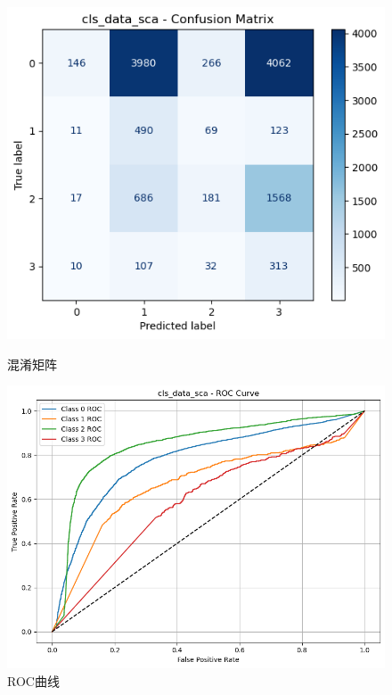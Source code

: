 \documentclass[10pt]{article}
\begin{document}
\begin{figure}[H]
\centering
\begin{minipage}[t]{0.45\textwidth}
  \centering
  \includegraphics[width=\linewidth]{cls_nb_sca1.png}
  \caption{混淆矩阵}
  \label{fig:17}
\end{minipage}
\hfill
\begin{minipage}[t]{0.52\textwidth}
  \centering
  \includegraphics[width=\linewidth]{cls_nb_sca2.png}
  \caption{ROC曲线}
  \label{fig:18}
\end{minipage}
\end{figure}
\end{document}
